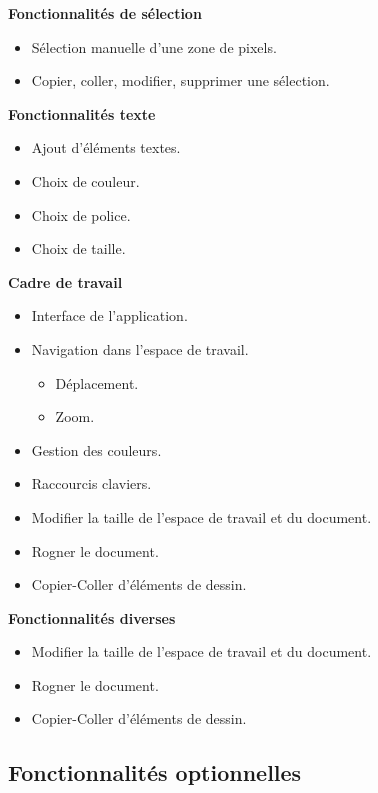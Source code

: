 \documentclass[11pt, a4paper, french]{article}
\begin{document}
			\textbf{Fonctionnalités de sélection}
			\begin{itemize}[label=\textbullet]
				\item Sélection manuelle d’une zone de pixels.
				\item Copier, coller, modifier, supprimer une sélection. \\
			\end{itemize}

			\textbf{Fonctionnalités texte}
			\begin{itemize}[label=\textbullet]
				\item Ajout d’éléments textes.
				\item Choix de couleur.
				\item Choix de police.
				\item Choix de taille. \\
			\end{itemize}

			\textbf{Cadre de travail}
			\begin{itemize}[label=\textbullet]
				\item Interface de l’application.
				\item Navigation dans l’espace de travail.
				\begin{itemize}[label=\textbullet]
					\item Déplacement.
					\item Zoom.
				\end{itemize}
				\item Gestion des couleurs.
				\item Raccourcis claviers.
				\item Modifier la taille de l’espace de travail et du document.
				\item Rogner le document.
				\item Copier-Coller d’éléments de dessin. \\
			\end{itemize}

			\textbf{Fonctionnalités diverses}
			\begin{itemize}[label=\textbullet]
				\item Modifier la taille de l’espace de travail et du document.
				\item Rogner le document.
				\item Copier-Coller d’éléments de dessin. \\
			\end{itemize}


		\subsection {Fonctionnalités optionnelles}
\end{document}
